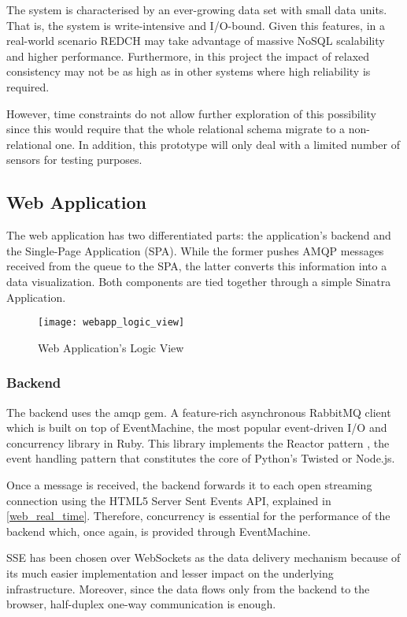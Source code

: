 The system is characterised by an ever-growing data set with small data units. That is, the system is write-intensive and I/O-bound. Given this features, in a real-world scenario REDCH may take advantage of massive NoSQL scalability and higher performance. Furthermore, in this project the impact of relaxed consistency may not be as high as in other systems where high reliability is required.

However, time constraints do not allow further exploration of this possibility since this would require that the whole relational schema migrate to a non-relational one. In addition, this prototype will only deal with a limited number of sensors for testing purposes.

\subsection{Web Application}

The web application has two differentiated parts: the application's backend and the Single-Page Application (SPA). While the former pushes AMQP messages received from the queue to the SPA, the latter converts this information into a data visualization. Both components are tied together through a simple Sinatra Application.

\begin{figure}[h]
	\centering
	\texttt{[image: webapp\_logic\_view]}
	\caption{Web Application's Logic View}
	\label{fig:webapp_logic_view}
\end{figure}

\subsubsection{Backend}

The backend uses the amqp gem. A feature-rich asynchronous RabbitMQ client which is built on top of EventMachine, the most popular event-driven I/O and concurrency library in Ruby. This library implements the Reactor pattern \cite{reactor}, the event handling pattern that constitutes the core of Python's Twisted or Node.js.

Once a message is received, the backend forwards it to each open streaming connection using the HTML5 Server Sent Events API, explained in \ref{web_real_time}. Therefore, concurrency is essential for the performance of the backend which, once again, is provided through EventMachine.

SSE has been chosen over WebSockets as the data delivery mechanism because of its much easier implementation and lesser impact on the underlying infrastructure. Moreover, since the data flows only from the backend to the browser, half-duplex one-way communication is enough.


